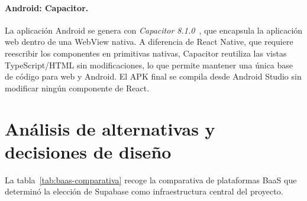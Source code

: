 \paragraph{Android: Capacitor.}
La aplicación Android se genera con \textit{Capacitor 8.1.0}~\cite{capacitor2024}, que encapsula la aplicación web dentro de una WebView nativa. A diferencia de React Native, que requiere reescribir los componentes en primitivas nativas, Capacitor reutiliza las vistas TypeScript/HTML sin modificaciones, lo que permite mantener una única base de código para web y Android. El APK final se compila desde Android Studio sin modificar ningún componente de React.

\section{Análisis de alternativas y decisiones de diseño}
\label{sec:dificultades}

La tabla~\ref{tab:baas-comparativa} recoge la comparativa de plataformas BaaS que determinó la elección de Supabase como infraestructura central del proyecto.


